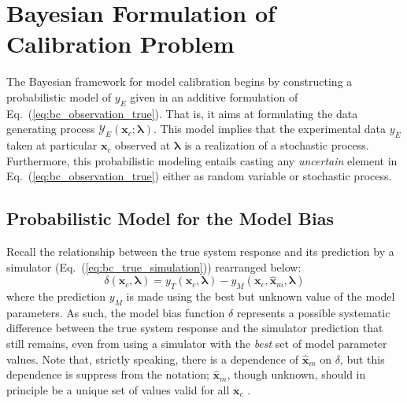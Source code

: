\section{Bayesian Formulation of Calibration Problem}\label{sec:bc_modular}

The Bayesian framework for model calibration begins by constructing a probabilistic model of $y_E$ given in an additive formulation of Eq.~(\ref{eq:bc_observation_true}). 
That is, it aims at formulating the data generating process $\mathcal{Y}_E(\bm{x}_c; \bm{\lambda})$.
This model implies that the experimental data $y_E$ taken at particular $\bm{x}_c$ observed at $\bm{\lambda}$ is a realization of a stochastic process.
Furthermore, this probabilistic modeling entails casting any \emph{uncertain} element in Eq.~(\ref{eq:bc_observation_true}) either as random variable or stochastic process.

\subsection{Probabilistic Model for the Model Bias}\label{sub:bc_modular_bias}

Recall the relationship between the true system response and its prediction by a simulator (Eq.~(\ref{eq:bc_true_simulation})) rearranged below:
\begin{equation*}
    \delta (\bm{x}_c, \boldsymbol{\lambda}) = y_T(\bm{x}_c, \boldsymbol{\lambda}) - y_M (\bm{x}_c, \hat{\bm{x}}_m, \boldsymbol{\lambda})
\end{equation*}
where the prediction $y_M$ is made using the best but unknown value of the model parameters.
As such, the model bias function $\delta$ represents a possible systematic difference between the true system response and the simulator prediction that still remains, even from using a simulator with the \emph{best} set of model parameter values.
Note that, strictly speaking, there is a dependence of $\hat{\bm{x}}_m$ on $\delta$, but this dependence is suppress from the notation; $\hat{\bm{x}}_m$, though unknown, should in principle be a unique set of values valid for all $\bm{x}_c$ \cite{Bayarri2007,Arendt2012}.

